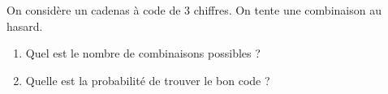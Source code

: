 
On considère un cadenas à code de 3 chiffres. On tente une combinaison au hasard.
\begin{enumerate}
\item Quel est le nombre de combinaisons possibles ?
\item Quelle est la probabilité de trouver le bon code ?
\end{enumerate}